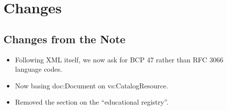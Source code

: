 \documentclass{ivoa}
\begin{document}
\section{Changes}

\subsection{Changes from the Note}

\begin{itemize}
\item Following XML itself, we now ask for BCP 47 rather than RFC
3066 language codes.
\item Now basing doc:Document on vs:CatalogResource.
\item Removed the section on the ``educational registry''.
\end{itemize}


\end{document}
